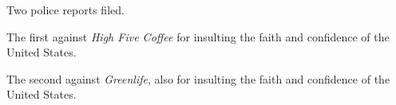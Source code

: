 

Two police reports filed.  

The first against {\it High Five Coffee} for insulting the faith and
confidence of the United States.

The second against {\it Greenlife}, also for insulting the faith and
confidence of the United States.

\bye
